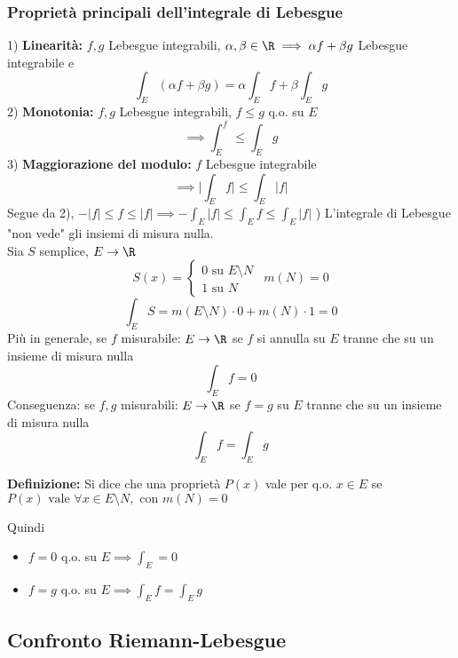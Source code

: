 \subsubsection{Proprietà principali dell'integrale di Lebesgue}
1) \textbf{Linearità: }$f,g$ Lebesgue integrabili, $\alpha, \beta\in\R\implies \alpha f+\beta g$ Lebesgue integrabile e 
\[\int_{E}^{} (\alpha f +\beta g)=\alpha \int_{E}^{} f+\beta \int_{E}^{} g\]
2) \textbf{Monotonia: }$f,g$ Lebesgue integrabili, $f\le g$ q.o. su $E$
\[\implies \int_{E}^{f} \le \int_{E}^{} g\]
3) \textbf{Maggiorazione del modulo: }$f$ Lebesgue integrabile 
\[\implies \bigg|\int_{E}^{} f\bigg|\le \int_{E}^{} |f|\]
Segue da 2), $-|f|\le f\le |f|\implies-\int_{E}^{} |f|\le \int_{E}^{} f\le \int_{E}^{} |f|$
) L'integrale di Lebesgue "non vede" gli insiemi di misura nulla.
\\Sia $S$ semplice, $E\to \R$
\[S(x)=\begin{cases}
	0\text{ su }E\setminus N
	\\1\text{ su }N
\end{cases}\ \ m(N)=0\]
\[\int_{E}^{} S=m(E\setminus N)\cdot 0+m(N)\cdot 1=0\]
Più in generale, se $f$ misurabile: $E\to \R$ se $f$ si annulla su $E$ tranne che su un insieme di misura nulla
\[\int_{E}^{} f=0\] 
Conseguenza: se $f,g$ misurabili: $E\to \R$ se $f=g$ su $E$ tranne che su un insieme di misura nulla
\[\int_{E}^{} f=\int_{E}^{} g\]  
\begin{tcolorbox}
	\textbf{Definizione:} Si dice che una proprietà $P(x)$ vale per q.o. $x\in E$ se $P(x)\text{ vale }\forall x\in E\setminus N,\text{ con }m(N)=0$
\end{tcolorbox}
Quindi
\begin{itemize}
	\item $f=0$ q.o. su $E\implies \int_{E}^{} =0 $
	\item $f=g$ q.o. su $E\implies \int_{E}^{} f=\int_{E}^{} g $
\end{itemize}
\subsection{Confronto Riemann-Lebesgue}
